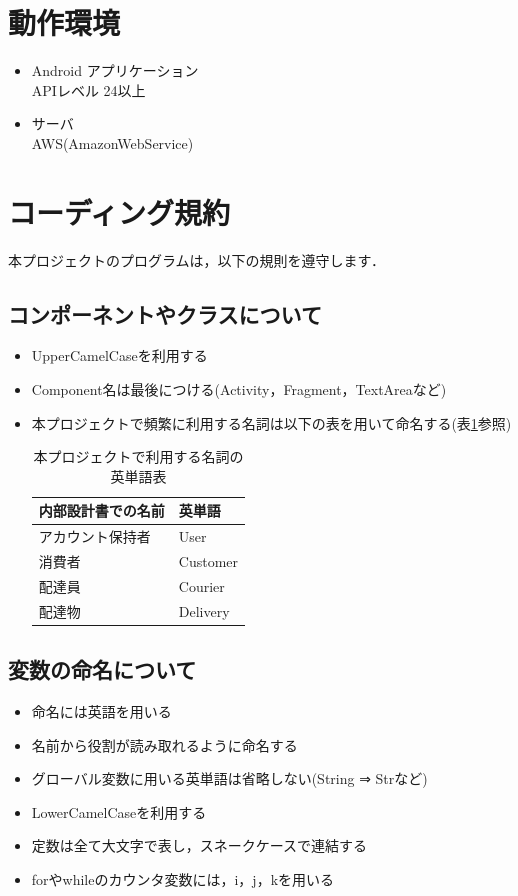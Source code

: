 \documentclass[a4j,titlepage]{jarticle}
\begin{document}
\section{動作環境}
\begin{itemize}
\item Android アプリケーション\\
  APIレベル 24以上
\item サーバ\\
  AWS(AmazonWebService)
\end{itemize}


\section{コーディング規約}
本プロジェクトのプログラムは，以下の規則を遵守します．
\subsection{コンポーネントやクラスについて}
\begin{itemize}
\item UpperCamelCaseを利用する
\item Component名は最後につける(Activity，Fragment，TextAreaなど)
\item 本プロジェクトで頻繁に利用する名詞は以下の表を用いて命名する(表\ref{termTable}参照)
\begin{table}[htb]
\centering
\caption{本プロジェクトで利用する名詞の英単語表}
\label{termTable}
\begin{tabular}{|ll|}
\hline
内部設計書での名前 & 英単語      \\ \hline
アカウント保持者  & User     \\
消費者       & Customer \\
配達員       & Courier  \\
配達物       & Delivery \\ \hline
\end{tabular}
\end{table}
\end{itemize}

\subsection{変数の命名について}
\begin{itemize}
\item 命名には英語を用いる
\item 名前から役割が読み取れるように命名する
\item グローバル変数に用いる英単語は省略しない(String ⇒ Strなど)
\item LowerCamelCaseを利用する
\item 定数は全て大文字で表し，スネークケースで連結する
\item forやwhileのカウンタ変数には，i，j，kを用いる
\end{itemize}
\end{document}
